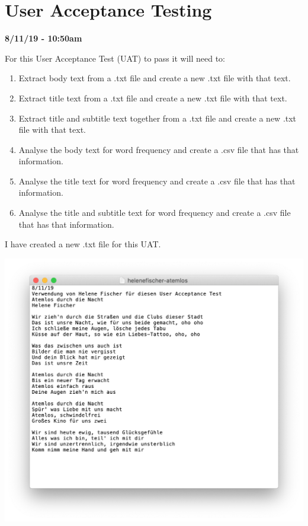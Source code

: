 \documentclass{article}
\begin{document}
\section{User Acceptance Testing}

\textbf{8/11/19 - 10:50am}

For this User Acceptance Test (UAT) to pass it will need to:
\begin{enumerate}
    \item Extract body text from a .txt file and create a new .txt file with that text.
    \item Extract title text from a .txt file and create a new .txt file with that text.
    \item Extract title and subtitle text together from a .txt file and create a new .txt file with that text.
    \item Analyse the body text for word frequency and create a .csv file that has that information.
    \item Analyse the title text for word frequency and create a .csv file that has that information.
    \item Analyse the title and subtitle text for word frequency and create a .csv file that has that information.
\end{enumerate}

I have created a new .txt file for this UAT.

\includegraphics[width=\textwidth]{uat01.png}
\end{document}
